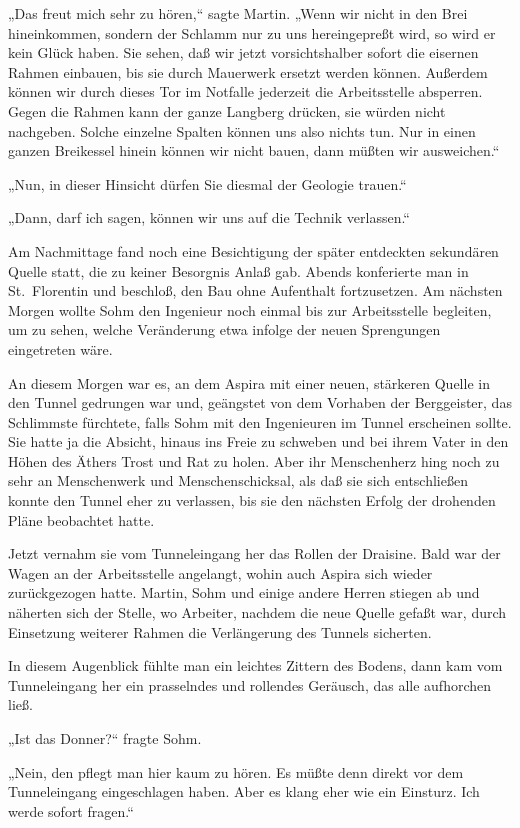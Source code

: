 „Das freut mich sehr zu hören,“ sagte Martin. „Wenn wir nicht in
den Brei hineinkommen, sondern der Schlamm nur zu uns hereingepreßt
wird, so wird er kein Glück haben. Sie sehen, daß wir jetzt
vorsichtshalber sofort die eisernen Rahmen einbauen, bis sie durch
Mauerwerk ersetzt werden können. Außerdem können wir durch dieses
Tor im Notfalle jederzeit die Arbeitsstelle absperren. Gegen die
Rahmen kann der ganze Langberg drücken, sie würden nicht nachgeben.
Solche einzelne Spalten können uns also nichts tun. Nur in einen
ganzen Breikessel hinein können wir nicht bauen, dann müßten wir
ausweichen.“

„Nun, in dieser Hinsicht dürfen Sie diesmal der Geologie trauen.“

„Dann, darf ich sagen, können wir uns auf die Technik verlassen.“

Am Nachmittage fand noch eine Besichtigung der später entdeckten
sekundären Quelle statt, die zu keiner Besorgnis Anlaß gab. Abends
konferierte man in St.~Florentin und beschloß, den Bau ohne
Aufenthalt fortzusetzen. Am nächsten Morgen wollte Sohm den
Ingenieur noch einmal bis zur Arbeitsstelle begleiten, um zu sehen,
welche Veränderung etwa infolge der neuen Sprengungen eingetreten
wäre.

An diesem Morgen war es, an dem Aspira mit einer neuen, stärkeren
Quelle in den Tunnel gedrungen war und, geängstet von dem Vorhaben
der Berggeister, das Schlimmste fürchtete, falls Sohm mit den
Ingenieuren im Tunnel erscheinen sollte. Sie hatte ja die Absicht,
hinaus ins Freie zu schweben und bei ihrem Vater in den Höhen des
Äthers Trost und Rat zu holen. Aber ihr Menschenherz hing noch zu
sehr an Menschenwerk und Menschenschicksal, als daß sie sich
entschließen konnte den Tunnel eher zu verlassen, bis sie den
nächsten Erfolg der drohenden Pläne beobachtet hatte.

Jetzt vernahm sie vom Tunneleingang her das Rollen der Draisine.
Bald war der Wagen an der Arbeitsstelle angelangt, wohin auch
Aspira sich wieder zurückgezogen hatte. Martin, Sohm und einige
andere Herren stiegen ab und näherten sich der Stelle, wo Arbeiter,
nachdem die neue Quelle gefaßt war, durch Einsetzung weiterer
Rahmen die Verlängerung des Tunnels sicherten.

In diesem Augenblick fühlte man ein leichtes Zittern des Bodens,
dann kam vom Tunneleingang her ein prasselndes und rollendes
Geräusch, das alle aufhorchen ließ.

„Ist das Donner?“ fragte Sohm.

„Nein, den pflegt man hier kaum zu hören. Es müßte denn direkt vor
dem Tunneleingang eingeschlagen haben. Aber es klang eher wie ein
Einsturz. Ich werde sofort fragen.“

